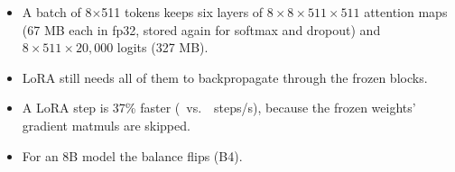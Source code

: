 \begin{itemize}[leftmargin=*,nosep]
\begin{itemize}[leftmargin=*,nosep]
\item A batch of 8$\times$511 tokens keeps six layers of $8\times8\times511\times511$ attention maps (67 MB each in fp32, stored again for softmax and dropout) and $8\times511\times20{,}000$ logits (327 MB).
\item LoRA still needs all of them to backpropagate through the frozen blocks.
\item A LoRA step is 37\% faster (\MemSpeedLoraFour\ vs.\ \MemSpeedFull\ steps/s), because the frozen weights' gradient matmuls are skipped.
\item For an 8B model the balance flips (B4).
\end{itemize}
\end{itemize}
